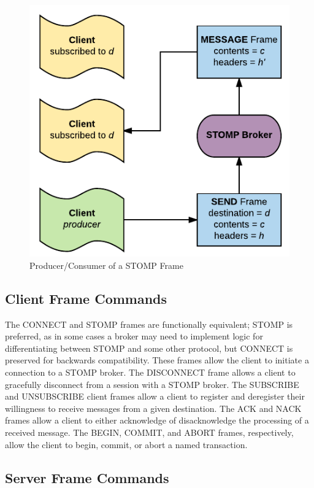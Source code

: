 \documentclass[conference, letterpaper]{IEEEtran}
\begin{document}
   \begin{figure}[h]
        \centering
        \ifCLASSINFOpdf
             \includegraphics[scale=.75]{send.pdf}
         \else
        \fi
        \caption{Producer/Consumer of a STOMP Frame}
        \label{prodcom}
    \end{figure}


\subsection{Client Frame Commands}

The CONNECT and STOMP frames are functionally equivalent; STOMP is preferred, as in some cases a broker may need to implement logic for differentiating between STOMP and some other protocol, but CONNECT is preserved for backwards compatibility. These frames allow the client to initiate a connection to a STOMP broker. The DISCONNECT frame allows a client to gracefully disconnect from a session with a STOMP broker. The SUBSCRIBE and UNSUBSCRIBE client frames allow a client to register and deregister their willingness to receive messages from a given destination. The ACK and NACK frames allow a client to either acknowledge of disacknowledge the processing of a received message. The BEGIN, COMMIT, and ABORT frames, respectively, allow the client to begin, commit, or abort a named transaction.

\subsection{Server Frame Commands}
\end{document}
